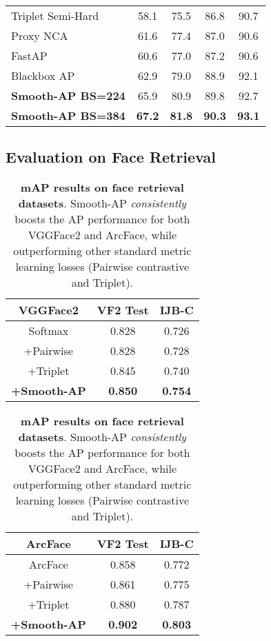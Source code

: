 \documentclass[runningheads]{llncs}
\begin{document}
\begin{table}[t]
{\begin{tabular}{l|cccc}
Triplet Semi-Hard~\cite{Wu17}          & 58.1     & 75.5     & 86.8     & 90.7     \\
Proxy NCA~\cite{Movshovitz17} & 61.6     & 77.4     & 87.0     & 90.6     \\
FastAP~\cite{Cakir19}                  & 60.6     & 77.0     & 87.2     & 90.6     \\
Blackbox AP~\cite{Rolnek20optimizing}  & 62.9     & 79.0     & 88.9     & 92.1     \\ \hline
\textbf{Smooth-AP BS=224}          & 65.9     & 80.9     & 89.8     & 92.7     \\
\textbf{Smooth-AP BS=384}          & \textbf{67.2}        & \textbf{81.8}        & \textbf{90.3}        & \textbf{93.1}        \\ \hline
\end{tabular} 

\label{tab:Inat}
}
\end{table}




\subsection{Evaluation on Face Retrieval} 
\label{sub:eval_face}


\setlength{\tabcolsep}{4pt}
\begin{table}[t]
\centering
\footnotesize
\caption{\small{\textbf{mAP results on face retrieval datasets}. 
Smooth-AP {\em consistently} boosts the AP performance for both VGGFace2 and ArcFace, 
while outperforming other standard metric learning losses (Pairwise contrastive and Triplet).}}
\label{tab:face_retrieval_results}
	\begin{tabular}{c|cc}
                        \hline
                        VGGFace2 & VF2 Test & IJB-C \\ \hline
                        Softmax                &  0.828   & 0.726 \\
                        +Pairwise              &  0.828   & 0.728 \\
                        +Triplet             &  0.845   & 0.740 \\ 
                       \textbf{+Smooth-AP}             &  {\bf 0.850}   & {\bf 0.754} \\ \hline
	\end{tabular}
\quad
	\begin{tabular}{c|cc}
                        \hline
                        ArcFace & VF2 Test & IJB-C \\ \hline
                        ArcFace            &  0.858   & 0.772 \\
                        +Pairwise               &  0.861   & 0.775 \\
                        +Triplet              &  0.880   & 0.787 \\ 
                  \textbf{+Smooth-AP}   & \textbf{0.902}    & \textbf{0.803} \\ \hline
	\end{tabular}
\end{table}
\end{document}
